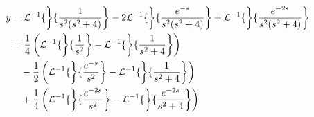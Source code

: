 \documentclass[diffeq.tex]{subfiles}
\begin{document}
\begin{example}
        \begin{alignat}{1}
            y &= \mathcal{L}^{-1}\{\left\}\{\frac{1}{s^{2}(s^{2} + 4)}\right\} - 2\mathcal{L}^{-1}\{\left\}\{\frac{e^{-s}}{s^{2}(s^{2} + 4)}\right\} + \mathcal{L}^{-1}\{\left\}\{\frac{e^{-2s}}{s^{2}(s^{2} + 4)}\right\}\\
            &= \frac{1}{4}\left(\mathcal{L}^{-1}\{\left\}\{\frac{1}{s^{2}}\right\} - \mathcal{L}^{-1}\{\left\}\{\frac{1}{s^{2} + 4}\right\}\right)\\
            &\quad - \frac{1}{2}\left(\mathcal{L}^{-1}\{\left\}\{\frac{e^{-s}}{s^{2}}\right\} - \mathcal{L}^{-1}\{\left\}\{\frac{1}{s^{2} + 4}\right\}\right)\\
            &\quad + \frac{1}{4}\left(\mathcal{L}^{-1}\{\left\}\{\frac{e^{-2s}}{s^{2}}\right\} - \mathcal{L}^{-1}\{\left\}\{\frac{e^{-2s}}{s^{2} + 4}\right\}\right)\nonumber
        \end{alignat}
    \end{example}
\end{document}
